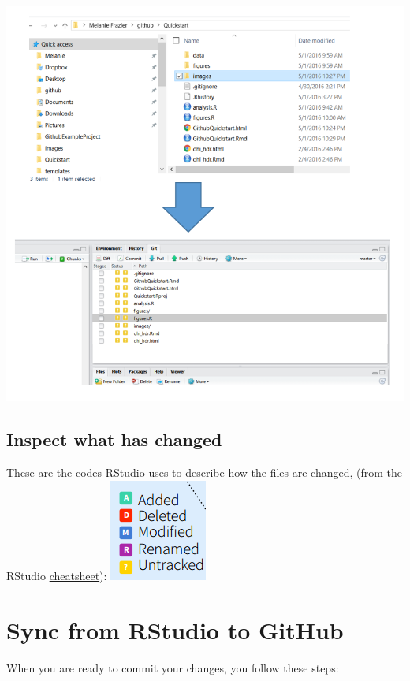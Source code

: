 \documentclass[]{book}
\begin{document}
\includegraphics{img/modify_files.png}

\hypertarget{inspect-what-has-changed}{%
\subsection{Inspect what has changed}\label{inspect-what-has-changed}}

These are the codes RStudio uses to describe how the files are changed, (from the RStudio \href{http://www.rstudio.com/wp-content/uploads/2016/01/rstudio-IDE-cheatsheet.pdf}{cheatsheet}):
\includegraphics{img/modified.png}

\hypertarget{sync-from-rstudio-to-github}{%
\section{Sync from RStudio to GitHub}\label{sync-from-rstudio-to-github}}

When you are ready to commit your changes, you follow these steps:
\end{document}
